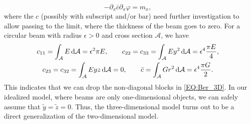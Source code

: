 \documentclass[a4paper, english, 12pt, reqno, draft]{amsart}
\theoremstyle{definition}
\theoremstyle{remark}
\numberwithin{equation}{section}
\newcommand{\torsion}{\ensuremath{\varphi}}
\newcommand{\momentum}{\ensuremath{m}}
\newcommand{\crossSect}{\ensuremath{\mathcal A}}
\begin{document}
% 
\begin{equation}
 -\partial_x \bar c \partial_x \torsion = \momentum_x,
\end{equation}
% 
where the $c$ (possibly with subscript and/or bar) need further investigation to allow passing to the limit, where the thickness of the beam goes to zero. For a circular beam with radius $\epsilon > 0$ and cross section $\crossSect$, we have
% 
\begin{gather*}
 c_{11} = \int_\crossSect E \, \textup d\crossSect = \epsilon^2 \pi E, \qquad c_{22} = c_{33} = \int_\crossSect E y^2 \, \textup d\crossSect = \epsilon^4 \frac{\pi E}{4}, \\
 c_{23} = c_{32} = \int_\crossSect E y z \, \textup d\crossSect = 0, \qquad \bar c = \int_\crossSect G r^2 \, \textup d \crossSect = \epsilon^4 \frac{\pi G}{2}.
\end{gather*}
% 
This indicates that we can drop the non-diagonal blocks in \eqref{EQ:Ber_3D}. In our idealized model, where beams are only one-dimensional objects, we can safely assume that $\tilde y = \tilde z = 0$. Thus, the three-dimensional model turns out to be a direct generalization of the two-dimensional model.


\newpage
% 


% 
\end{document}
